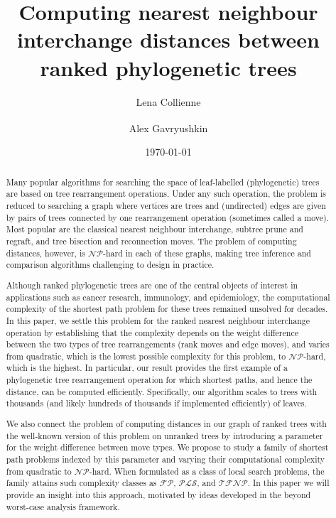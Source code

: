 \documentclass[11pt]{amsart}
\title[Computing $\rnni$ distance]{Computing nearest neighbour interchange distances between ranked phylogenetic trees}
\date{\today}
\author{Lena Collienne}
\author{Alex Gavryushkin\textsuperscript{\Letter}}
\newcommand{\pls}{\mathcal{PLS}}
\newcommand{\tfnp}{\mathcal{TFNP}}
\newcommand{\fpc}{\mathcal{FP}}
\newcommand{\np}{\mathcal{NP}}
\begin{document}
\begin{abstract}
Many popular algorithms for searching the space of leaf-labelled (phylogenetic) trees are based on tree rearrangement operations.
Under any such operation, the problem is reduced to searching a graph where vertices are trees and (undirected) edges are given by pairs of trees connected by one rearrangement operation (sometimes called a move).
Most popular are the classical nearest neighbour interchange, subtree prune and regraft, and tree bisection and reconnection moves.
The problem of computing distances, however, is $\np$-hard in each of these graphs, making tree inference and comparison algorithms challenging to design in practice.

Although ranked phylogenetic trees are one of the central objects of interest in applications such as cancer research, immunology, and epidemiology, the computational complexity of the shortest path problem for these trees remained unsolved for decades.
In this paper, we settle this problem for the ranked nearest neighbour interchange operation by establishing that the complexity depends on the weight difference between the two types of tree rearrangements (rank moves and edge moves), and varies from quadratic, which is the lowest possible complexity for this problem, to $\np$-hard, which is the highest.
In particular, our result provides the first example of a phylogenetic tree rearrangement operation for which shortest paths, and hence the distance, can be computed efficiently.
Specifically, our algorithm scales to trees with thousands (and likely hundreds of thousands if implemented efficiently) of leaves.

We also connect the problem of computing distances in our graph of ranked trees with the well-known version of this problem on unranked trees by introducing a parameter for the weight difference between move types.
We propose to study a family of shortest path problems indexed by this parameter and varying their computational complexity from quadratic to $\np$-hard.
When formulated as a class of local search problems, the family attains such complexity classes as $\fpc$, $\pls$, and $\tfnp$.
In this paper we will provide an insight into this approach, motivated by ideas developed in the beyond worst-case analysis framework.
\end{abstract}


\maketitle
\end{document}
